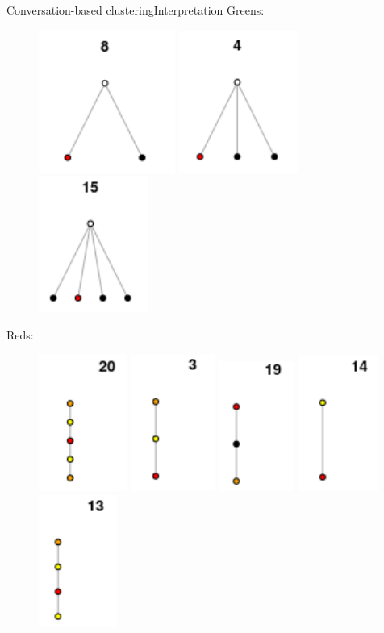 \documentclass{beamer}
\begin{document}
\begin{frame}{Conversation-based clustering}{Interpretation}
	Greens:
	\begin{figure}
		\centering
		\includegraphics[height=0.17\textwidth]{motif8}
		\includegraphics[height=0.17\textwidth]{motif4}
		\includegraphics[height=0.17\textwidth]{motif15}
	\end{figure}	
	Reds:
	\begin{figure}
		\centering
		\includegraphics[height=0.17\textwidth]{motif20}
		\includegraphics[height=0.17\textwidth]{motif3}
		\includegraphics[height=0.17\textwidth]{motif19}	
		\includegraphics[height=0.17\textwidth]{motif14}	
		\includegraphics[height=0.17\textwidth]{motif13}	

\end{figure}
\end{frame}
\end{document}
